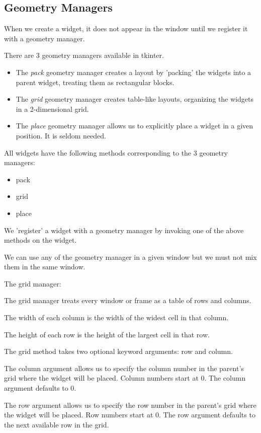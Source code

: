 \documentclass{article}
\begin{document}
\subsection{Geometry Managers}
When we create a widget, it does not appear in the window until we register it with a geometry manager.

There are 3 geometry managers available in tkinter.  
\begin{itemize}
\item The \textit{pack} geometry manager  creates a layout by 'packing' the widgets into a parent widget,  treating them as rectangular blocks. 
\item The \textit{grid} geometry manager creates table-like layouts, organizing the widgets in a 2-dimensional grid. 
\item The \textit{place} geometry manager allows us to explicitly place a widget in a given position. It is seldom needed.
\end{itemize}

All widgets have the following methods corresponding to the 3 geometry managers:
\begin{itemize}
\item pack
\item grid
\item place
\end{itemize}

We 'register' a widget with a geometry manager by invoking one of the above methods on the widget.

We can use any of the geometry manager in a given window but we must not mix them in the same window.

The grid manager:

The grid manager treats every window or frame as a table of rows and columns.

The width of each column is the width of the widest cell in that column.

The height of each row is the height of the largest cell in that row.

The grid method takes two optional keyword arguments:  row and column.

The column argument allows us to specify the column number in the parent's grid where the widget will be placed.  Column numbers start at 0.   The column argument defaults to 0.

The row argument allows us to specify the row number in the parent's grid where the widget will be placed.  Row numbers start at 0.  The row argument defaults to the next available  row in the grid.
\end{document}

